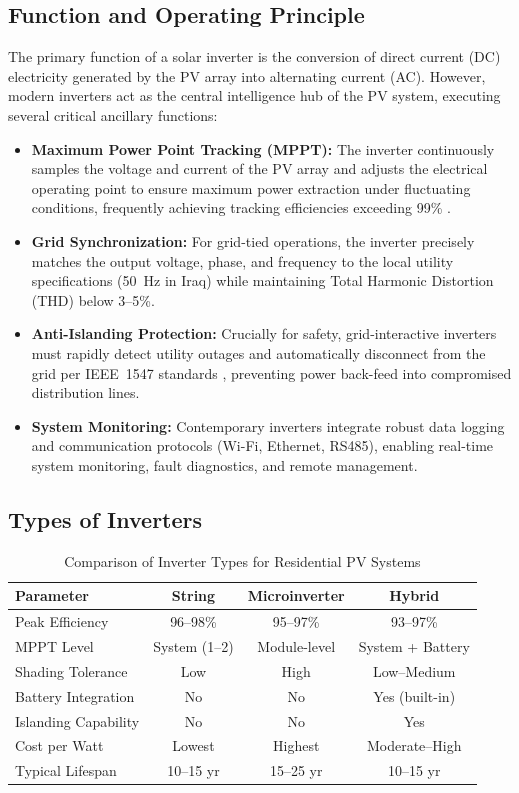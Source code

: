 \subsection{Function and Operating Principle}

The primary function of a solar inverter is the conversion of direct current (DC) electricity generated by the PV array into alternating current (AC). However, modern inverters act as the central intelligence hub of the PV system, executing several critical ancillary functions:

\begin{itemize}
    \item \textbf{Maximum Power Point Tracking (MPPT):} The inverter continuously samples the voltage and current of the PV array and adjusts the electrical operating point to ensure maximum power extraction under fluctuating conditions, frequently achieving tracking efficiencies exceeding 99\% \cite{esram2007}.
    \item \textbf{Grid Synchronization:} For grid-tied operations, the inverter precisely matches the output voltage, phase, and frequency to the local utility specifications (50~Hz in Iraq) while maintaining Total Harmonic Distortion (THD) below 3--5\%.
    \item \textbf{Anti-Islanding Protection:} Crucially for safety, grid-interactive inverters must rapidly detect utility outages and automatically disconnect from the grid per IEEE~1547 standards \cite{ieee1547}, preventing power back-feed into compromised distribution lines.
    \item \textbf{System Monitoring:} Contemporary inverters integrate robust data logging and communication protocols (Wi-Fi, Ethernet, RS485), enabling real-time system monitoring, fault diagnostics, and remote management.
\end{itemize}


\subsection{Types of Inverters}

\begin{table}[H]
\centering
\caption{Comparison of Inverter Types for Residential PV Systems}
\label{tab:inverter_comparison}
\small
\begin{tabular}{@{}p{3.5cm} c c c@{}}
\toprule
\textbf{Parameter} & \textbf{String} & \textbf{Microinverter} & \textbf{Hybrid} \\
\midrule
Peak Efficiency & 96--98\% & 95--97\% & 93--97\% \\
MPPT Level & System (1--2) & Module-level & System + Battery \\
Shading Tolerance & Low & High & Low--Medium \\
Battery Integration & No & No & Yes (built-in) \\
Islanding Capability & No & No & Yes \\
Cost per Watt & Lowest & Highest & Moderate--High \\
Typical Lifespan & 10--15 yr & 15--25 yr & 10--15 yr \\
\bottomrule
\end{tabular}
\end{table}

